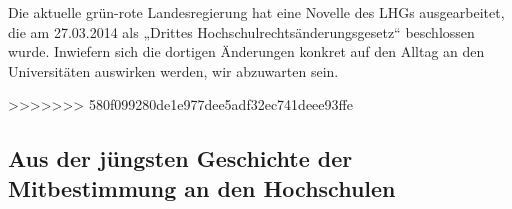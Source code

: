 Die aktuelle grün-rote Landesregierung hat eine Novelle des LHGs ausgearbeitet, 
die am 27.03.2014 als „Drittes Hochschulrechtsänderungsgesetz“ beschlossen wurde.
Inwiefern sich die dortigen Änderungen konkret auf den Alltag an den Universitäten 
auswirken werden, wir abzuwarten sein.

>>>>>>> 580f099280de1e977dee5adf32ec741deee93ffe

\subsection{Aus der jüngsten Geschichte der Mitbestimmung an den Hochschulen}


